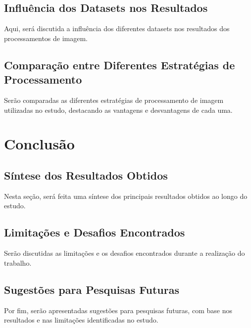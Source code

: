 \section{Influência dos Datasets nos Resultados}
Aqui, será discutida a influência dos diferentes datasets nos resultados dos processamentos de imagem.

\section{Comparação entre Diferentes Estratégias de Processamento}
Serão comparadas as diferentes estratégias de processamento de imagem utilizadas no estudo, destacando as vantagens e desvantagens de cada uma.

\chapter{Conclusão}
\section{Síntese dos Resultados Obtidos}
Nesta seção, será feita uma síntese dos principais resultados obtidos ao longo do estudo.

\section{Limitações e Desafios Encontrados}
Serão discutidas as limitações e os desafios encontrados durante a realização do trabalho.

\section{Sugestões para Pesquisas Futuras}
Por fim, serão apresentadas sugestões para pesquisas futuras, com base nos resultados e nas limitações identificadas no estudo.
